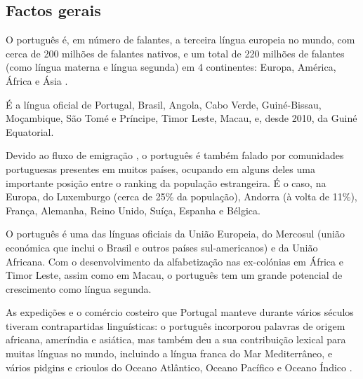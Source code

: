 \documentclass[]{../metanetpaper}
\begin{document}
\clearpage



\begin{multicols}{2}

\subsection{Factos gerais}

O português é, em número de falantes, a terceira língua europeia no mundo, com cerca de 200 milhões de falantes nativos, e um total de 220 milhões de falantes (como língua materna e língua segunda) em 4 continentes: Europa, América, África e Ásia\cite{observatorio} \cite{ethnologue}.


É a língua oficial de Portugal, Brasil, Angola, Cabo Verde, Guiné-Bissau, Moçambique, São Tomé e Príncipe, Timor Leste, Macau, e, desde 2010, da Guiné Equatorial. 

Devido ao fluxo de emigração \cite{stat1}\cite{obsemig}, o português é também falado por comunidades portuguesas presentes em muitos países, ocupando em alguns deles uma importante posição entre o ranking da população estrangeira. É o caso, na Europa, do Luxemburgo (cerca de 25\% da população), Andorra (à volta de 11\%), França, Alemanha, Reino Unido, Suíça, Espanha e Bélgica\cite{linha}. 

O português é uma das línguas oficiais da União Europeia, do Mercosul (união económica que inclui o Brasil e outros países sul-americanos) e da União Africana. Com o desenvolvimento da alfabetização nas ex-colónias em África e Timor Leste, assim como em Macau, o português tem um grande potencial de crescimento como língua segunda. 

As expedições e o comércio costeiro que Portugal manteve durante vários séculos tiveram contrapartidas linguísticas: o português incorporou palavras de origem africana, ameríndia e asiática, mas também deu a sua contribuição lexical para muitas línguas no mundo, incluindo a língua franca do Mar Mediterrâneo, e vários pidgins e crioulos do Oceano Atlântico, Oceano Pacífico e Oceano Índico\cite{andrade} \cite{camoes}. 


\end{multicols}
\end{document}
